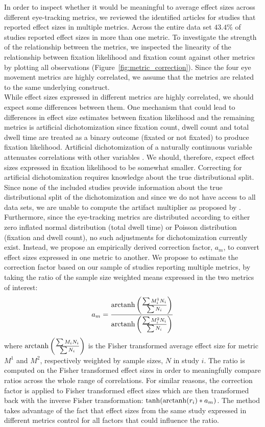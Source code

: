 In order to inspect whether it would be meaningful to average effect sizes across different eye-tracking metrics, we reviewed the identified articles for studies that reported effect sizes in multiple metrics. Across the entire data set $43.4$\% of studies reported effect sizes in more than one metric. To investigate the strength of the relationship between the metrics, we inspected the linearity of the relationship between fixation likelihood and fixation count against other metrics by plotting all observations (Figure~\ref{fig:metric_correction}). Since the four eye movement metrics are highly correlated, we assume that the metrics are related to the same underlying construct.\\ 
While effect sizes expressed in different metrics are highly correlated, we should expect some differences between them. One mechanism that could lead to differences in effect size estimates between fixation likelihood and the remaining metrics is artificial dichotomization since fixation count, dwell count and total dwell time are treated as a binary outcome (fixated or not fixated) to produce fixation likelihood. Artificial dichotomization of a naturally continuous variable attenuates correlations with other variables \citep{hunter2004a}. We should, therefore, expect effect sizes expressed in fixation likelihood to be somewhat smaller. Correcting for artificial dichotomization requires knowledge about the true distributional split. Since none of the included studies provide information about the true distributional split of the dichotomization and since we do not have access to all data sets, we are unable to compute the artifact multiplier as proposed by \cite{hunter2004a}. Furthermore, since the eye-tracking metrics are distributed according to either zero inflated normal distribution (total dwell time) or Poisson distribution (fixation and dwell count), no such adjustments for dichotomization currently exist. Instead, we propose an empirically derived correction factor, $a_m$, to convert effect sizes expressed in one metric to another. We propose to estimate the correction factor based on our sample of studies reporting multiple metrics, by taking the ratio of the sample size weighted means expressed in the two metrics of interest:
%
\begin{equation}
\label{eq:metrics_correction}
a_m = \frac{\operatorname{arctanh} \left( \frac{\sum M_i^1 N_i}{\sum N_i} \right)}{\operatorname{arctanh} \left( \frac{\sum M_i^2 N_i}{\sum N_i} \right)}
\end{equation}
%
where $\operatorname{arctanh} \left( \frac{\sum M_i N_i}{\sum N_i} \right)$ is the Fisher transformed average effect size for metric $M^1$ and $M^2$, respectively weighted by sample sizes, $N$ in study $i$. The ratio is computed on the Fisher transformed effect sizes in order to meaningfully compare ratios across the whole range of correlations. For similar reasons, the correction factor is applied to Fisher transformed effect sizes which are then transformed back with the inverse Fisher transformation: $\tanh(\operatorname{arctanh}(r_i)*a_m)$. The method takes advantage of the fact that effect sizes from the same study expressed in different metrics control for all factors that could influence the ratio.\\    
